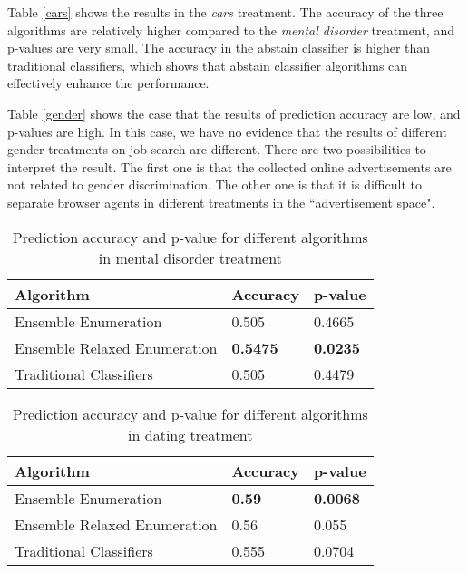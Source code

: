 \documentclass[12pt, journal]{IEEEtran}
\begin{document}
Table \ref{cars} shows the results in the \textit{cars} treatment.
The accuracy of the three algorithms are relatively higher compared to the \textit{mental disorder} treatment, and p-values are very small.
The accuracy in the abstain classifier is higher than traditional classifiers, which shows that abstain classifier algorithms can effectively enhance the performance.

Table \ref{gender} shows the case that the results of prediction accuracy are low, and p-values are high.
In this case, we have no evidence that the results of different gender treatments on job search are different.
There are two possibilities to interpret the result. The first one is that the collected online advertisements are not related to gender discrimination. The other one is that it is difficult to separate browser agents in different treatments in the ``advertisement space".
 
\begin{table}[t]
\centering
\caption{Prediction accuracy and p-value for different algorithms in mental disorder treatment}
\label{mentaldisorder}
\begin{tabular}{|l|l|l|}
\hline
Algorithm                    & Accuracy        & p-value         \\ \hline
Ensemble Enumeration         & 0.505           & 0.4665          \\ \hline
Ensemble Relaxed Enumeration & \textbf{0.5475} & \textbf{0.0235} \\ \hline
Traditional Classifiers      & 0.505           & 0.4479          \\ \hline
\end{tabular}
\end{table}

\begin{table}[t]
\centering
\caption{Prediction accuracy and p-value for different algorithms in dating treatment}
\label{dating}
\begin{tabular}{|l|l|l|}
\hline
Algorithm                    & Accuracy        & p-value         \\ \hline
Ensemble Enumeration         & \textbf{0.59}           & \textbf{0.0068}          \\ \hline
Ensemble Relaxed Enumeration & 0.56 & 0.055 \\ \hline
Traditional Classifiers      & 0.555           & 0.0704          \\ \hline
\end{tabular}
\end{table}
\end{document}
